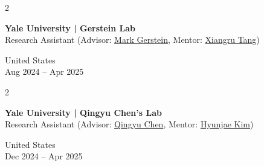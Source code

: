 \documentclass[11pt, letterpaper]{article}
\newenvironment{highlights}{
    \begin{itemize}[
        topsep=0.10 cm,
        parsep=0.10 cm,
        partopsep=0pt,
        itemsep=0pt,
        leftmargin=0 cm + 10pt
    ]
}{
    \end{itemize}
} %
\newenvironment{twocolentry}[2][]{
    \onecolentry
    \def\secondColumn{#2}
    \setcolumnwidth{\fill, 4.8 cm}
    \begin{paracol}{2}
}{
    \switchcolumn \raggedleft \secondColumn
    \end{paracol}
    \endonecolentry
} %
\begin{document}
\begin{twocolentry}{
    United States\\
    Aug 2024 -- Apr 2025
}
\textbf{Yale University | Gerstein Lab} \href{https://www.gersteinlab.org/}{\faExternalLink*}\\
Research Assistant (Advisor: \href{https://scholar.google.com/citations?user=YvjuUugAAAAJ&hl=en}{Mark Gerstein}, Mentor: \href{https://scholar.google.com.hk/citations?user=gGcRkpYAAAAJ&hl=en}{Xiangru Tang})
\end{twocolentry}

\vspace{0.2 cm}
\begin{twocolentry}{
    United States\\
    Dec 2024 -- Apr 2025
}
\textbf{Yale University | Qingyu Chen's Lab} \href{https://sites.google.com/view/qingyuchen/home/}{\faExternalLink*}\\
Research Assistant (Advisor: \href{https://scholar.google.com/citations?user=FSLotiMAAAAJ&hl=en}{Qingyu Chen}, Mentor: \href{https://scholar.google.com/citations?user=rqBpumIAAAAJ&hl=en}{Hyunjae Kim})
\end{twocolentry}
\end{document}

